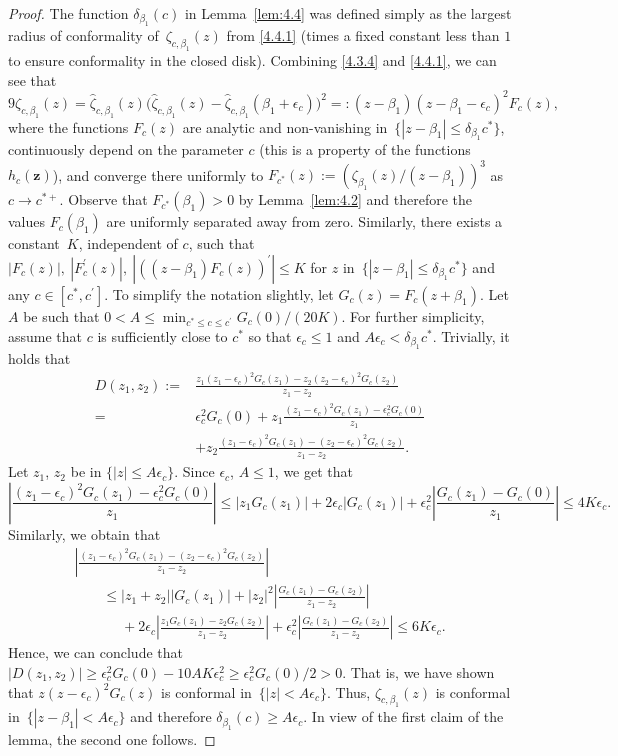 \documentclass[pdftex]{sigma}
\numberwithin{equation}{section}
\newcommand{\z}	{{\boldsymbol z}}
\begin{document}
\begin{proof}
The function $ \delta_{\beta_1}(c) $ in Lemma~\ref{lem:4.4} was defined simply as the largest radius of conformality of~$ \zeta_{c,\beta_1}(z) $ from \eqref{4.4.1} (times a fixed constant less than $ 1 $ to ensure conformality in the closed disk). Combining \eqref{4.3.4} and \eqref{4.4.1}, we can see that
\[
9\zeta_{c,\beta_1}(z) = \hat\zeta_{c,\beta_1}(z)\bigl(\hat\zeta_{c,\beta_1}(z) - \hat\zeta_{c,\beta_1}(\beta_1+\epsilon_c) \bigr)^2 =: (z-\beta_1)(z-\beta_1-\epsilon_c)^2 F_c(z),
\]
where the functions $ F_c(z) $ are analytic and non-vanishing in~$ \{|z-\beta_1| \leq \delta_{\beta_1}c^* \} $, continuously depend on the parameter $ c $ (this is a property of the functions $ h_c(\z) $), and converge there uniformly to $ F_{c^*}(z) := (\zeta_{\beta_1}(z)/(z-\beta_1) )^3 $ as $ c\to c^{*+} $. Observe that $ F_{c^*}(\beta_1)>0 $ by Lemma~\ref{lem:4.2} and therefore the values $ F_c(\beta_1) $ are uniformly separated away from zero. Similarly, there exists a constant~$ K $, independent of $ c $, such that
$
|F_c(z)|,~|F_c^\prime(z)|,~|((z-\beta_1)F_c(z))^\prime| \leq K$
for $ z $ in~$ {\{|z-\beta_1| \leq \delta_{\beta_1}c^* \}} $ and any $ c\in[c^*,c^\prime] $. To simplify the notation slightly, let $ G_c(z) = F_c(z+\beta_1) $. Let $ A $ be such that $ 0< A\leq \min_{c^*\leq c\leq c^\prime}G_c(0)/(20K)$. For further simplicity, assume that $ c $ is sufficiently close to $ c^* $ so that $ \epsilon_c\leq 1 $ and $ A\epsilon_c<\delta_{\beta_1}c^* $. Trivially, it holds that
\begin{align*}
D(z_1,z_2):={} &\frac{z_1(z_1-\epsilon_c)^2G_c(z_1)-z_2(z_2-\epsilon_c)^2G_c(z_2)}{z_1-z_2}\\
 ={} & \epsilon_c^2 G_c(0) + z_1 \frac{(z_1-\epsilon_c)^2 G_c(z_1)-\epsilon_c^2 G_c(0)}{z_1}\\
 & + z_2 \frac{(z_1-\epsilon_c)^2 G_c(z_1)-(z_2 - \epsilon_c)^2 G_c(z_2)}{z_1-z_2}.
\end{align*}
Let $ z_1$, $z_2 $ be in $ \{ |z| \leq A\epsilon_c\} $. Since $ \epsilon_c$, $A\leq 1 $, we get that
\[
\left|\frac{(z_1-\epsilon_c)^2 G_c(z_1)-\epsilon_c^2 G_c(0)}{z_1}\right| \leq |z_1G_c(z_1)| + 2\epsilon_c|G_c(z_1)| + \epsilon_c^2\left|\frac{G_c(z_1)-G_c(0)}{z_1}\right| \leq 4K\epsilon_c.
\]
Similarly, we obtain that
\begin{gather*}
\left| \frac{(z_1-\epsilon_c)^2 G_c(z_1)-(z_2 - \epsilon_c)^2 G_c(z_2)}{z_1-z_2} \right| \\
\qquad\leq |z_1+z_2||G_c(z_1)| + |z_2|^2\left|\frac{G_c(z_1)-G_c(z_2)}{z_1-z_2}\right| \\
\qquad\phantom{\leq}{} + 2\epsilon_c \left| \frac{z_1G_c(z_1)-z_2G_c(z_2)}{z_1-z_2} \right| + \epsilon_c^2\left|\frac{G_c(z_1)-G_c(z_2)}{z_1-z_2}\right| \leq 6K\epsilon_c.
\end{gather*}
Hence, we can conclude that
$
|D(z_1,z_2)| \geq \epsilon_c^2 G_c(0) - 10AK\epsilon_c^2 \geq \epsilon_c^2 G_c(0)/2>0$.
That is, we have shown that $ z(z-\epsilon_c)^2G_c(z) $ is conformal in~$ {\{ |z|<A\epsilon_c\}} $. Thus, $ \zeta_{c,\beta_1}(z) $ is conformal in~$ {\{|z-\beta_1|<A\epsilon_c\}} $ and therefore $ \delta_{\beta_1}(c)\geq A\epsilon_c $. In view of the first claim of the lemma, the second one follows.
\end{proof}
\end{document}
